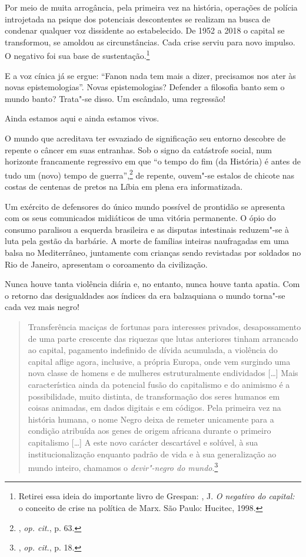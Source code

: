 Por meio de muita arrogância, pela primeira vez na história, operações
de polícia introjetada na psique dos potenciais descontentes se realizam
na busca de condenar qualquer voz dissidente ao estabelecido. De 1952 a
2018 o capital se transformou, se amoldou as circunstâncias. Cada crise
serviu para novo impulso. O negativo foi sua base de
sustentação.\footnote{Retirei essa ideia do importante livro de Grespan:
  , J. \emph{O negativo do capital:} o conceito de crise na
  política de Marx. São Paulo: Hucitec, 1998.}

E a voz cínica já se ergue: ``Fanon nada tem mais a dizer, precisamos
nos ater às novas epistemologias''. Novas epistemologias? Defender a
filosofia banto sem o mundo banto? Trata"-se disso. Um escândalo, uma
regressão!

Ainda estamos aqui e ainda estamos vivos.

O mundo que acreditava ter esvaziado de significação seu entorno
descobre de repente o câncer em suas entranhas. Sob o signo da
catástrofe social, num horizonte francamente regressivo em que ``o tempo
do fim (da História) é antes de tudo um (novo) tempo de
guerra'',\footnote{, \emph{op. cit.}, p. 63.} de repente, ouvem"-se
estalos de chicote nas costas de centenas de pretos na Líbia em plena
era informatizada.

Um exército de defensores do único mundo possível de prontidão se
apresenta com os seus comunicados midiáticos de uma vitória permanente.
O ópio do consumo paralisou a esquerda brasileira e as disputas
intestinais reduzem"-se à luta pela gestão da barbárie. A morte de
famílias inteiras naufragadas em uma balsa no Mediterrâneo, juntamente
com crianças sendo revistadas por soldados no Rio de Janeiro, apresentam
o coroamento da civilização.

Nunca houve tanta violência diária e, no entanto, nunca houve tanta
apatia. Com o retorno das desigualdades aos índices da era balzaquiana o
mundo torna"-se cada vez mais negro!

\begin{quote}
Transferência maciças de fortunas
para interesses privados, desapossamento de uma parte crescente das
riquezas que lutas anteriores tinham arrancado ao capital, pagamento
indefinido de dívida acumulada, a violência do capital aflige agora,
inclusive, a própria Europa, onde vem surgindo uma nova classe de homens
e de mulheres estruturalmente endividados {[}\ldots{}{]} Mais característica
ainda da potencial fusão do capitalismo e do animismo é a possibilidade,
muito distinta, de transformação dos seres humanos em coisas animadas,
em dados digitais e em códigos. Pela primeira vez na história humana, o
nome Negro deixa de remeter unicamente para a condição atribuída aos
genes de origem africana durante o primeiro capitalismo {[}\ldots{}{]} A este
novo carácter descartável e solúvel, à sua institucionalização enquanto
padrão de vida e à sua generalização ao mundo inteiro, chamamos o
\emph{devir"-negro do mundo}.\footnote{, \emph{op. cit.}, p. 18.}
\end{quote}

